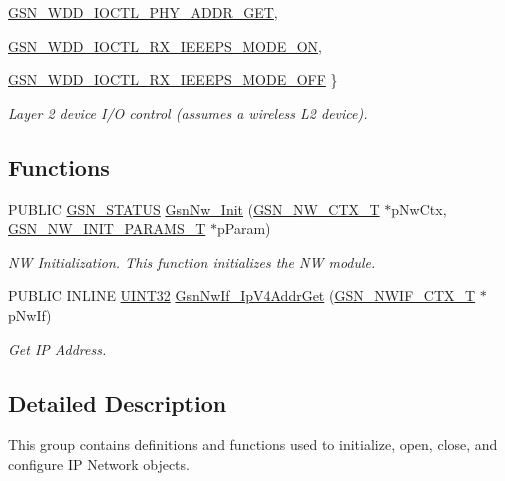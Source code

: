 \begin{DoxyCompactItemize}
\par
\hyperlink{a00670_ggaf67ac3e77c7a5742b9b0bc7672529533a13b9b199720d5323049dc71fa3abbb0f}{GSN\_\-WDD\_\-IOCTL\_\-PHY\_\-ADDR\_\-GET}, 
\par
\hyperlink{a00670_ggaf67ac3e77c7a5742b9b0bc7672529533a37563cd4302ca3be0f252a5b431f807a}{GSN\_\-WDD\_\-IOCTL\_\-RX\_\-IEEEPS\_\-MODE\_\-ON}, 
\par
\hyperlink{a00670_ggaf67ac3e77c7a5742b9b0bc7672529533ad7bdc6ddeb1968420616edcb71644a66}{GSN\_\-WDD\_\-IOCTL\_\-RX\_\-IEEEPS\_\-MODE\_\-OFF}
 \}
\begin{DoxyCompactList}\small\item\em Layer 2 device I/O control (assumes a wireless L2 device). \end{DoxyCompactList}\end{DoxyCompactItemize}
\subsection*{Functions}
\begin{DoxyCompactItemize}
\item 
PUBLIC \hyperlink{a00660_gada5951904ac6110b1fa95e51a9ddc217}{GSN\_\-STATUS} \hyperlink{a00670_ga86680611203d42252fc6f05608b7d75d}{GsnNw\_\-Init} (\hyperlink{a00164}{GSN\_\-NW\_\-CTX\_\-T} $\ast$pNwCtx, \hyperlink{a00165}{GSN\_\-NW\_\-INIT\_\-PARAMS\_\-T} $\ast$pParam)
\begin{DoxyCompactList}\small\item\em NW Initialization. This function initializes the NW module. \end{DoxyCompactList}\item 
PUBLIC INLINE \hyperlink{a00660_gae1e6edbbc26d6fbc71a90190d0266018}{UINT32} \hyperlink{a00670_ga4dd1a9b0b97290fe2749d1f9834f5c19}{GsnNwIf\_\-IpV4AddrGet} (\hyperlink{a00167}{GSN\_\-NWIF\_\-CTX\_\-T} $\ast$pNwIf)
\begin{DoxyCompactList}\small\item\em Get IP Address. \end{DoxyCompactList}\end{DoxyCompactItemize}


\subsection{Detailed Description}
This group contains definitions and functions used to initialize, open, close, and configure IP Network objects. 

